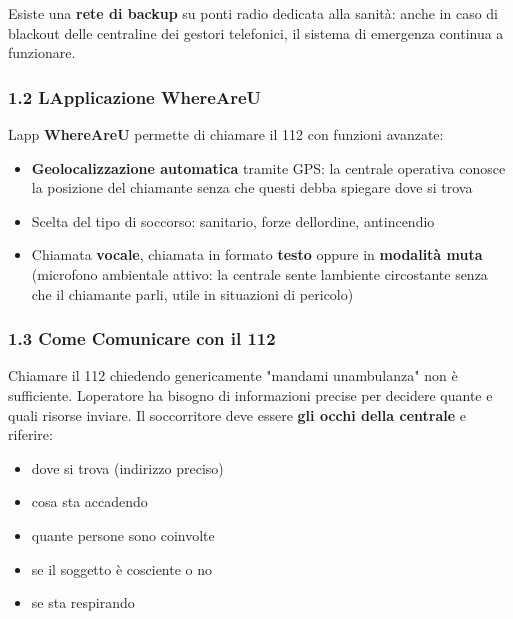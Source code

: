 \documentclass[a4paper,11pt]{article}
\providecommand{\tightlist}{%
  \setlength{\itemsep}{0pt}\setlength{\parskip}{0pt}}
\begin{document}
Esiste una \textbf{rete di backup} su ponti radio dedicata alla sanità:
anche in caso di blackout delle centraline dei gestori telefonici, il
sistema di emergenza continua a funzionare.

\subsubsection{1.2 L\textquotesingle Applicazione
      WhereAreU}\label{lapplicazione-whereareu}

L\textquotesingle app \textbf{WhereAreU} permette di chiamare il 112 con
funzioni avanzate:

\begin{itemize}
      \tightlist
      \item
            \textbf{Geolocalizzazione automatica} tramite GPS: la centrale
            operativa conosce la posizione del chiamante senza che questi debba
            spiegare dove si trova
      \item
            Scelta del tipo di soccorso: sanitario, forze
            dell\textquotesingle ordine, antincendio
      \item
            Chiamata \textbf{vocale}, chiamata in formato \textbf{testo} oppure in
            \textbf{modalità muta} (microfono ambientale attivo: la centrale sente
            l\textquotesingle ambiente circostante senza che il chiamante parli,
            utile in situazioni di pericolo)
\end{itemize}

\subsubsection{1.3 Come Comunicare con il
      112}\label{come-comunicare-con-il-112}

Chiamare il 112 chiedendo genericamente "mandami
un\textquotesingle ambulanza" non è sufficiente.
L\textquotesingle operatore ha bisogno di informazioni precise per
decidere quante e quali risorse inviare. Il soccorritore deve essere
\textbf{gli occhi della centrale} e riferire:

\begin{itemize}
      \tightlist
      \item
            dove si trova (indirizzo preciso)
      \item
            cosa sta accadendo
      \item
            quante persone sono coinvolte
      \item
            se il soggetto è cosciente o no
      \item
            se sta respirando
\end{itemize}
\end{document}
